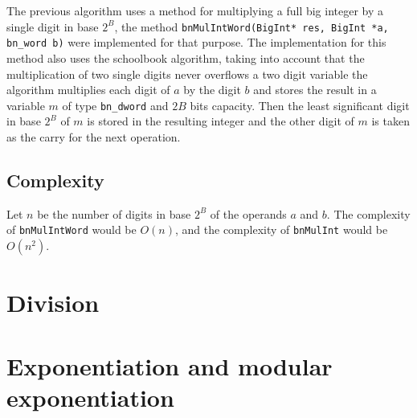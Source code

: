 \documentclass{book}
\begin{document}
The previous algorithm uses a method for multiplying a full big integer by a single digit in base $2^B$, the method \verb+bnMulIntWord(BigInt* res, BigInt *a, bn_word b)+ were implemented for that purpose. The implementation for this method also uses the schoolbook algorithm, taking into account that the multiplication of two single digits never overflows a two digit variable the algorithm multiplies each digit of $a$ by the digit $b$ and stores the result in a variable $m$ of type \verb+bn_dword+ and $2B$ bits capacity. Then the least significant digit in base $2^B$ of $m$ is stored in the resulting integer and the other digit of $m$ is taken as the carry for the next operation.

\subsection{Complexity}
Let $n$ be the number of digits in base $2^B$ of the operands $a$ and $b$. The complexity of \verb+bnMulIntWord+ would be $O(n)$, and the complexity of \verb+bnMulInt+ would be $O(n^2)$.

\section{Division}
 
\section{Exponentiation and modular exponentiation}
\end{document}
